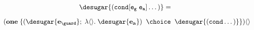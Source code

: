 \documentclass[]{article}
\begin{document}
$$
\desugar{\tt{(cond [} e_g \; e_a \tt{] \dots)}} =  \;\; 
$$

$$
(\bf{one} \; \{(\desugar{e_{\guard}} ; \; \lambda\langle\rangle.\; \desugar{e_{a}}) \;\; \choice \;\;
\desugar{\tt{(cond \dots)}}\})\langle\rangle  \\
$$  




















\end{document}
